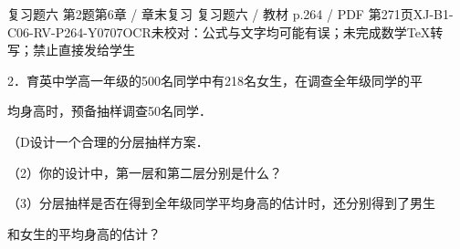 \begin{bankitem}{复习题六 第2题}{第6章 / 章末复习 复习题六 / 教材 p.264 / PDF 第271页}{XJ-B1-C06-RV-P264-Y0707}{OCR未校对：公式与文字均可能有误；未完成数学TeX转写；禁止直接发给学生}
\begin{ocrdraft}
\par
2．育英中学高一年级的500名同学中有218名女生，在调查全年级同学的平
\par
均身高时，预备抽样调查50名同学．
\par
（D设计一个合理的分层抽样方案．
\par
（2）你的设计中，第一层和第二层分别是什么？
\par
（3）分层抽样是否在得到全年级同学平均身高的估计时，还分别得到了男生
\par
和女生的平均身高的估计？
\end{ocrdraft}
\end{bankitem}
